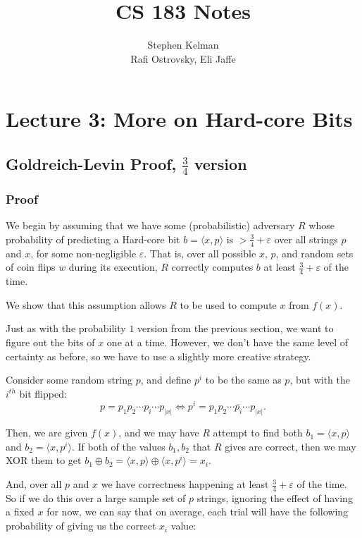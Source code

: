 \documentclass[11pt]{article}
\title{CS 183 Notes}
\author{Stephen Kelman\\ Rafi Ostrovsky, Eli Jaffe}
\begin{document}
\section{Lecture 3: More on Hard-core Bits}


\subsection{Goldreich-Levin Proof, \(\frac{3}{4}\) version}


\subsubsection{Proof}

We begin by assuming that we have some (probabilistic) adversary \(R\) whose probability of predicting a Hard-core bit \(b=\langle x,p\rangle\) is \(>\frac{3}{4}+\varepsilon\) over all strings \(p\) and \(x\), for some non-negligible \(\varepsilon\). That is, over all possible \(x\), \(p\), and random sets of coin flips \(w\) during its execution, \(R\) correctly computes \(b\) at least \(\frac{3}{4}+\varepsilon\) of the time.\medskip

We show that this assumption allows \(R\) to be used to compute \(x\) from \(f(x)\). \bigskip

Just as with the probability \(1\) version from the previous section, we want to figure out the bits of \(x\) one at a time. However, we don't have the same level of certainty as before, so we have to use a slightly more creative strategy. \smallskip

Consider some random string \(p\), and define \(p^i\) to be the same as \(p\), but with the \(i^{th}\) bit flipped:
\[p=p_1p_2\cdots p_i\cdots p_{|x|} \iff p^i = p_1p_2\cdots\overline{p_i}\cdots p_{|x|}.\]

Then, we are given \(f(x)\), and we may have \(R\) attempt to find both \(b_1 = \langle x,p\rangle\) and \(b_2 = \langle x,p^i\rangle\). If both of the values \(b_1,b_2\) that \(R\) gives are correct, then we may XOR them to get \(b_1\oplus b_2 = \langle x,p\rangle\oplus\langle x,p^i\rangle = x_i\).\smallskip

 And, over all \(p\) and \(x\) we have correctness happening at least \(\frac{3}{4}+\varepsilon\) of the time. So if we do this over a large sample set of \(p\) strings, ignoring the effect of having a fixed \(x\) for now, we can say that on average, each trial will have the following probability of giving us the correct \(x_i\) value:
\end{document}
